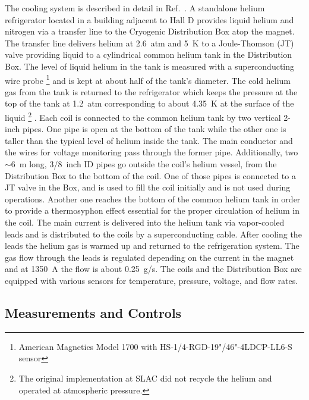 The cooling system is described in detail in Ref.~\cite{Lavendure:2014:refrig}.
A standalone helium refrigerator located
in a building adjacent to Hall D provides liquid helium and nitrogen
via a transfer line to the Cryogenic Distribution Box atop the
magnet. The transfer line delivers helium at 2.6~atm and 5~K to a Joule-Thomson
(JT) valve providing liquid to a cylindrical common helium tank in the
Distribution Box. The level of liquid helium in the tank is measured
with a superconducting wire probe%
\footnote{
  American Magnetics Model 1700 with HS-1/4-RGD-19"/46"-4LDCP-LL6-S sensor
}
 and is kept at about half of the tank's diameter. The cold helium gas
 from the tank is returned to the refrigerator which keeps the
 pressure at the top of the tank at 1.2~atm corresponding to about
 4.35~K at the surface of the liquid%
\footnote{
  The original implementation at SLAC did not recycle the helium and
  operated at atmospheric pressure.
}
.
Each coil is connected to the common helium tank by two vertical 2-inch
pipes.  One pipe is open at the bottom of the tank while the other one
is taller than the typical level of helium inside the tank. The main
conductor and the wires for voltage monitoring pass through the former
pipe. Additionally, two $\sim$6~m long, 3/8~inch ID pipes go outside
the coil's helium vessel, from the Distribution Box to the bottom of
the coil. One of those pipes is connected to a JT valve in the Box,
and is used to fill the coil initially and is not used during operations.
Another one reaches the bottom of
the common helium tank in order to provide 
a thermosyphon effect essential
for the proper circulation of helium in the coil. The main current is
delivered into the helium tank via vapor-cooled leads and is
distributed to the coils by a superconducting cable. After cooling the
leads the helium gas is warmed up and returned to the refrigeration
system. The gas flow through the leads is regulated depending on the
current in the magnet and at 1350~A the flow is about 0.25~g/s. The
coils and the Distribution Box are equipped with various sensors for
temperature, pressure, voltage, and flow rates.

\subsection[Measurements and Controls]{
         Measurements and Controls
        \label{sec:sol:controls}
}


